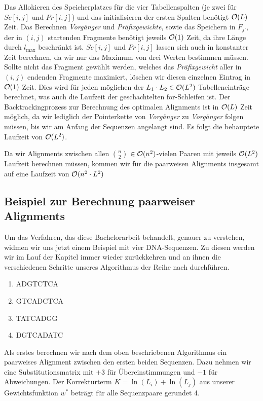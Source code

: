 \begin{beweis}
	Das Allokieren des Speicherplatzes für die vier Tabellenspalten (je zwei für $Sc[i,j]$ und $Pr[i,j]$) und das initialisieren der ersten Spalten benötigt $\mathcal{O}(L)$ Zeit. Das Berechnen \emph{Vorgänger} und \emph{Präfixgewichte}, sowie das Speichern in $F_{j'}$, der in $(i,j)$ startenden Fragmente benötigt jeweils $\mathcal{O}(1)$ Zeit, da ihre Länge durch $l_{\max}$ beschränkt ist. $Sc[i,j]$ und $Pr[i,j]$ lassen sich auch in konstanter Zeit berechnen, da wir nur das Maximum von drei Werten bestimmen müssen. Sollte nicht das Fragment gewählt werden, welches das \emph{Präfixgewicht} aller in $(i,j)$ endenden Fragmente maximiert, löschen wir diesen einzelnen Eintrag in $\mathcal{O}(1)$ Zeit. Dies wird für jeden möglichen der $L_1 \cdot L_2 \in \mathcal{O}(L^2)$ Tabelleneinträge berechnet, was auch die Laufzeit der geschachtelten for-Schleifen ist.
	Der Backtrackingprozess zur Berechnung des optimalen Alignments ist in $\mathcal{O}(L)$ Zeit möglich, da wir lediglich der Pointerkette von \emph{Vorgänger} zu \emph{Vorgänger} folgen müssen, bis wir am Anfang der Sequenzen angelangt sind.
	Es folgt die behauptete Laufzeit von $\mathcal{O}(L^2)$.
\end{beweis}

Da wir Alignments zwischen allen ${n}\choose{2}$ $\in \mathcal{O}(n^2)$-vielen Paaren mit jeweils $\mathcal{O}(L^2)$ Laufzeit berechnen müssen, kommen wir für die paarweisen Alignments insgesamt auf eine Laufzeit von $\mathcal{O}(n^2\cdot L^2)$

\subsection{Beispiel zur Berechnung paarweiser Alignments} 
Um das Verfahren, das diese Bachelorarbeit behandelt, genauer zu verstehen, widmen wir uns jetzt einem Beispiel mit vier DNA-Sequenzen. Zu diesen werden wir im Lauf der Kapitel immer wieder zurückkehren und an ihnen die verschiedenen Schritte unseres Algorithmus der Reihe nach durchführen.
\ttfamily
\begin{enumerate}[topsep=0pt,itemsep=-1ex,partopsep=1ex,parsep=1ex]
	\item ADGTCTCA
	\item GTCADCTCA
	\item TATCADGG
	\item DGTCADATC
\end{enumerate}
\normalfont
Als erstes berechnen wir nach dem oben beschriebenen Algorithmus ein paarweises Alignment zwischen den ersten beiden Sequenzen. Dazu nehmen wir eine Substitutionsmatrix mit $+3$ für Übereinstimmungen und $-1$ für Abweichungen. Der Korrekturterm $K = \ln(L_i) + \ln(L_j)$ aus unserer Gewichtsfunktion $w^*$ beträgt für alle Sequenzpaare gerundet 4. 

